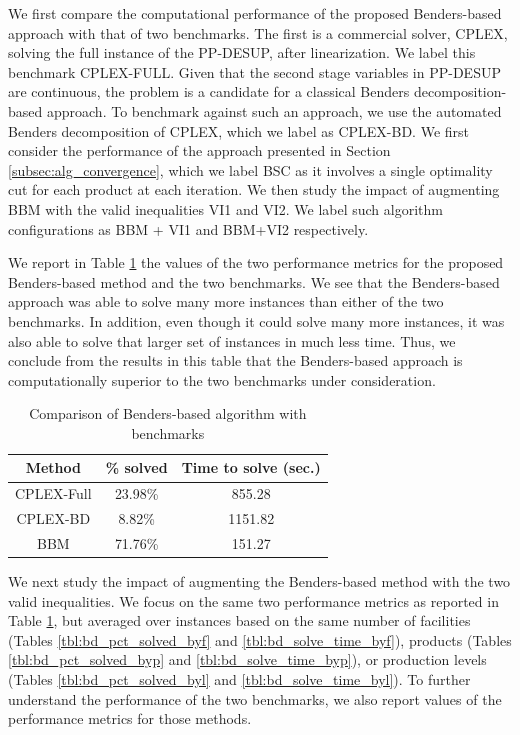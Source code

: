 \documentclass[12pt]{article}
\theoremstyle{thmstylethree}%
\begin{document}
We first compare the computational performance of the proposed Benders-based approach with that of two benchmarks. The first is a commercial solver, CPLEX, solving the full instance of the PP-DESUP, after linearization. We label this benchmark CPLEX-FULL. Given that the second stage variables in PP-DESUP are continuous, the problem is a candidate for a classical Benders decomposition-based approach. To benchmark against such an approach, we use the automated Benders decomposition of CPLEX, which we label as CPLEX-BD. We first consider the performance of the approach presented in Section \ref{subsec:alg_convergence}, which we label BSC as it involves a single optimality cut for each product at each iteration. We then study the impact of augmenting BBM with the valid inequalities VI1 and VI2. We label such algorithm configurations as BBM + VI1 and BBM+VI2 respectively. 

We report in Table \ref{tbl:comp_bench} the values of the two performance metrics for the proposed Benders-based method and the two benchmarks. We see that the Benders-based approach was able to solve many more instances than either of the two benchmarks. In addition, even though it could solve many more instances, it was also able to solve that larger set of instances in much less time. Thus, we conclude from the results in this table that the Benders-based approach is computationally superior to the two benchmarks under consideration.

\begin{table}[htp]
\center
\begin{tabular}{|c|c|c|}
\hline
Method & \% solved & Time to solve (sec.) \\
\hline
CPLEX-Full & 23.98\% & 855.28 \\
CPLEX-BD & 8.82\% & 1151.82 \\
BBM & 71.76\% & 151.27 \\
\hline
\end{tabular}
\caption{Comparison of Benders-based algorithm with benchmarks}
\label{tbl:comp_bench}
\end{table}

We next study the impact of augmenting the Benders-based method with the two valid inequalities. We focus on the same two performance metrics as reported in Table \ref{tbl:comp_bench}, but averaged over instances based on the same number of facilities (Tables \ref{tbl:bd_pct_solved_byf} and \ref{tbl:bd_solve_time_byf}), products (Tables \ref{tbl:bd_pct_solved_byp} and \ref{tbl:bd_solve_time_byp}), or production levels (Tables \ref{tbl:bd_pct_solved_byl} and \ref{tbl:bd_solve_time_byl}). To further understand the performance of the two benchmarks, we also report values of the performance metrics for those methods. 
\end{document}
